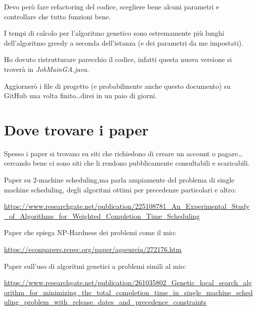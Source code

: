 \documentclass[12pt, letterpaper]{article}
\begin{document}
Devo però fare refactoring del codice, scegliere bene alcuni parametri e controllare che tutto funzioni bene.

I tempi di calcolo per l'algoritmo genetico sono estremamente più lunghi dell'algoritmo greedy a seconda dell'istanza (e dei parametri da me impostati).

Ho dovuto ristrutturare parecchio il codice, infatti questa nuova versione si troverà in \textit{JobMainGA.java}.

Aggiornerò i file di progetto (e probabilmente anche questo documento) su GitHub una volta finito\ldots direi in un paio di giorni.

\section{Dove trovare i paper}
Spesso i paper si trovano su siti che richiedono di creare un account o pagare\ldots cercando bene ci sono siti che li rendono pubblicamente consultabili e scaricabili.

Paper su 2-machine scheduling,ma parla ampiamente del problema di single machine scheduling, degli algoritmi ottimi per precedenze particolari e altro\cite{Baev}:

\medskip
\url{https://www.researchgate.net/publication/225108781_An_Experimental_Study_of_Algorithms_for_Weighted_Completion_Time_Scheduling}

\medskip
Paper che spiega NP-Hardness dei problemi come il mio\cite{Lenstra}: 

\medskip
\url{https://econpapers.repec.org/paper/agseureia/272176.htm}

\medskip
Paper sull'uso di algoritmi genetici a problemi simili al mio\cite{Zaidi}: 

\medskip
\url{https://www.researchgate.net/publication/261035802_Genetic_local_search_algorithm_for_minimizing_the_total_completion_time_in_single_machine_scheduling_problem_with_release_dates_and_precedence_constraints}

\printbibliography
\end{document}
